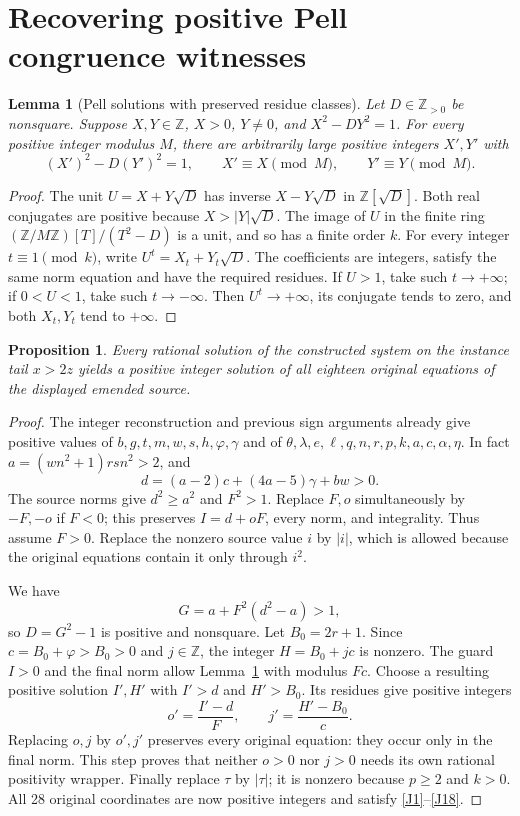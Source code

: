 \documentclass[11pt]{article}
\newtheorem{lemma}[theorem]{Lemma}
\newtheorem{proposition}[theorem]{Proposition}
\newcommand{\Z}{\mathbb Z}
\newcommand{\Np}{\mathbb Z_{>0}}
\begin{document}
\section{Recovering positive Pell congruence witnesses}
\begin{lemma}[Pell solutions with preserved residue classes]\label{pell-lift}
Let \(D\in\Np\) be nonsquare. Suppose \(X,Y\in\Z\),
\(X>0\), \(Y\ne0\), and \(X^2-DY^2=1\). For every positive
integer modulus \(M\), there are arbitrarily large positive integers
\(X',Y'\) with
\[
 (X')^2-D(Y')^2=1,\qquad X'\equiv X\pmod M,\qquad
 Y'\equiv Y\pmod M.
\]
\end{lemma}
\begin{proof}
The unit \(U=X+Y\sqrt D\) has inverse \(X-Y\sqrt D\) in
\(\Z[\sqrt D]\). Both real conjugates are positive because
\(X>|Y|\sqrt D\). The image of \(U\) in the finite ring
\((\Z/M\Z)[T]/(T^2-D)\) is a unit, and so has a finite order \(k\).
For every integer \(t\equiv1\pmod k\), write
\(U^t=X_t+Y_t\sqrt D\). The coefficients are integers, satisfy the
same norm equation and have the required residues. If \(U>1\), take
such \(t\to+\infty\); if \(0<U<1\), take such \(t\to-\infty\).
Then \(U^t\to+\infty\), its conjugate tends to zero, and both
\(X_t,Y_t\) tend to \(+\infty\).
\end{proof}

\begin{proposition}\label{positive-reconstruction}
Every rational solution of the constructed system on the instance tail
\(x>2z\) yields a positive integer solution of all eighteen original
equations of the displayed emended source.
\end{proposition}
\begin{proof}
The integer reconstruction and previous sign arguments already give
positive values of $b,g,t,m,w,s,h,\varphi,\gamma$ and of
$\theta,\lambda,e,\ell,q,n,r,p,k,a,c,\alpha,\eta$.
In fact \(a=(wn^2+1)rsn^2>2\), and
\[
 d=(a-2)c+(4a-5)\gamma+bw>0.
\]
The source norms give \(d^2\ge a^2\) and \(F^2>1\). Replace
\(F,o\) simultaneously by \(-F,-o\) if \(F<0\); this preserves
\(I=d+oF\), every norm, and integrality. Thus assume \(F>0\).
Replace the nonzero source value \(i\) by \(|i|\), which is allowed
because the original equations contain it only through \(i^2\).

We have
\[
 G=a+F^2(d^2-a)>1,
\]
so \(D=G^2-1\) is positive and nonsquare. Let \(B_0=2r+1\).
Since \(c=B_0+\varphi>B_0>0\) and \(j\in\Z\), the integer
\(H=B_0+jc\) is nonzero. The guard \(I>0\) and the final norm
allow Lemma~\ref{pell-lift} with modulus \(Fc\).
Choose a resulting positive solution \(I',H'\) with
\(I'>d\) and \(H'>B_0\). Its residues give positive integers
\[
 o'=\frac{I'-d}{F},\qquad
 j'=\frac{H'-B_0}{c}.
\]
Replacing \(o,j\) by \(o',j'\) preserves every original equation:
they occur only in the final norm. This step proves that neither
\(o>0\) nor \(j>0\) needs its own rational positivity wrapper.
Finally replace \(\tau\) by \(|\tau|\); it is nonzero because
\(p\ge2\) and \(k>0\). All 28 original coordinates are now positive
integers and satisfy \eqref{J1}--\eqref{J18}.
\end{proof}
\end{document}
